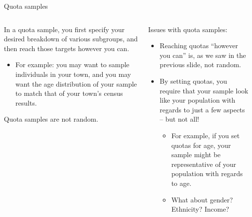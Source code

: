 \documentclass[aspectratio=169]{../latex_main/tntbeamer}  %
\begin{document}
	\begin{frame}{Quota samples}
	    \begin{columns}
	        \begin{column}{.4\textwidth}
	            In a quota sample, you first specify your desired breakdown of various subgroups, and then reach those targets however you can.
	             \begin{itemize}
	                 \item For example: you may want to sample individuals in your town, and you may want the age distribution of your sample to match that of your town’s census results.
	             \end{itemize}
	                \bigskip
	               Quota samples are not random.

	        \end{column}
	        \begin{column}{.4\textwidth}
	               Issues with quota samples:
                   \begin{itemize}
                       \item Reaching quotas “however you can” is, as we saw in the previous slide, not random.
                       \item By setting quotas, you require that your sample look like your population with regards to just a few aspects – but not all!
                       \begin{itemize}
                           \item For example, if you set quotas for age, your sample might be representative of your population with regards to age.
                           \item What about gender? Ethnicity? Income?
                       \end{itemize}
 
                   \end{itemize}
	        \end{column}
	    \end{columns}
	\end{frame}
\end{document}
